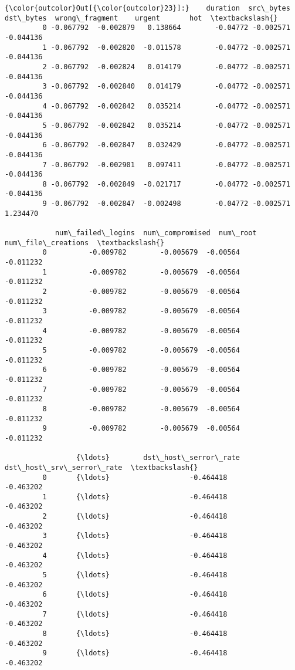 \documentclass[11pt]{article}
\begin{document}
\begin{Verbatim}[commandchars=\\\{\}]
{\color{outcolor}Out[{\color{outcolor}23}]:}    duration  src\_bytes  dst\_bytes  wrong\_fragment    urgent       hot  \textbackslash{}
         0 -0.067792  -0.002879   0.138664        -0.04772 -0.002571 -0.044136   
         1 -0.067792  -0.002820  -0.011578        -0.04772 -0.002571 -0.044136   
         2 -0.067792  -0.002824   0.014179        -0.04772 -0.002571 -0.044136   
         3 -0.067792  -0.002840   0.014179        -0.04772 -0.002571 -0.044136   
         4 -0.067792  -0.002842   0.035214        -0.04772 -0.002571 -0.044136   
         5 -0.067792  -0.002842   0.035214        -0.04772 -0.002571 -0.044136   
         6 -0.067792  -0.002847   0.032429        -0.04772 -0.002571 -0.044136   
         7 -0.067792  -0.002901   0.097411        -0.04772 -0.002571 -0.044136   
         8 -0.067792  -0.002849  -0.021717        -0.04772 -0.002571 -0.044136   
         9 -0.067792  -0.002847  -0.002498        -0.04772 -0.002571  1.234470   
         
            num\_failed\_logins  num\_compromised  num\_root  num\_file\_creations  \textbackslash{}
         0          -0.009782        -0.005679  -0.00564           -0.011232   
         1          -0.009782        -0.005679  -0.00564           -0.011232   
         2          -0.009782        -0.005679  -0.00564           -0.011232   
         3          -0.009782        -0.005679  -0.00564           -0.011232   
         4          -0.009782        -0.005679  -0.00564           -0.011232   
         5          -0.009782        -0.005679  -0.00564           -0.011232   
         6          -0.009782        -0.005679  -0.00564           -0.011232   
         7          -0.009782        -0.005679  -0.00564           -0.011232   
         8          -0.009782        -0.005679  -0.00564           -0.011232   
         9          -0.009782        -0.005679  -0.00564           -0.011232   
         
                 {\ldots}        dst\_host\_serror\_rate  dst\_host\_srv\_serror\_rate  \textbackslash{}
         0       {\ldots}                   -0.464418                 -0.463202   
         1       {\ldots}                   -0.464418                 -0.463202   
         2       {\ldots}                   -0.464418                 -0.463202   
         3       {\ldots}                   -0.464418                 -0.463202   
         4       {\ldots}                   -0.464418                 -0.463202   
         5       {\ldots}                   -0.464418                 -0.463202   
         6       {\ldots}                   -0.464418                 -0.463202   
         7       {\ldots}                   -0.464418                 -0.463202   
         8       {\ldots}                   -0.464418                 -0.463202   
         9       {\ldots}                   -0.464418                 -0.463202   
         

\end{Verbatim}
\end{document}
